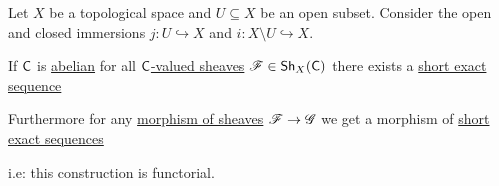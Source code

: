 \documentclass[../../main]{subfiles}
\begin{document}
\begin{theorem}\label{thm:SES-exactness}
  Let \(X\) be a topological space and \(U \subseteq X\) be an open subset.
  Consider the open and closed immersions \(j\colon U \hookrightarrow X\) and \(i\colon X \setminus U \hookrightarrow X\).

  If \(\mathsf{C}\) is \hyperref[def:abelian-category]{abelian} for all \hyperref[def:sheaf]{\(\mathsf{C}\)-valued sheaves} \(\mathscr{F} \in \mathsf{Sh}_{X}(\mathsf{C})\) there exists a \hyperref[def:exact-sequence]{short exact sequence}
  \begin{center}
  \end{center}
  Furthermore for any \hyperref[def:sheaf]{morphism of sheaves} \(\mathscr{F} \to \mathscr{G}\) we get a morphism of \hyperref[def:exact-sequence]{short exact sequences}
  \begin{center}
  \end{center}
  i.e: this construction is functorial.
\end{theorem}
\end{document}
